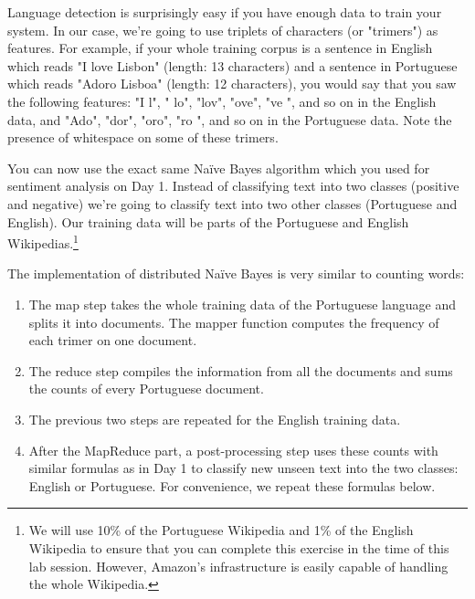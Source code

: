Language detection is surprisingly easy if you have enough data to train your system. In our case, we're going to use triplets of characters (or "trimers") as features. For example, if your whole training corpus is a sentence in English which reads "I love Lisbon" (length: 13 characters) and a sentence in Portuguese which reads "Adoro Lisboa" (length: 12 characters), you would say that you saw the following features: "I l", " lo", "lov", "ove", "ve ", and so on in the English data, and "Ado", "dor", "oro", "ro ", and so on in the Portuguese data. Note the presence of whitespace on some of these trimers.

You can now use the exact same Na\"{i}ve Bayes algorithm which you used for sentiment analysis on Day 1. Instead of classifying text into two classes (positive and negative) we're going to classify text into two other classes (Portuguese and English). Our training data will be parts of the Portuguese and English Wikipedias.\footnote{We will use 10\% of the Portuguese Wikipedia and 1\% of the English Wikipedia to ensure that you can complete this exercise in the time of this lab session. However, Amazon's infrastructure is easily capable of handling the whole Wikipedia.}

The implementation of distributed Na\"{i}ve Bayes is very similar to counting words:
\begin{enumerate}
	\item The map step takes the whole training data of the Portuguese language and splits it into documents. The mapper function computes the frequency of each trimer on one document.
	\item The reduce step compiles the information from all the documents and sums the counts of every Portuguese document.
	\item The previous two steps are repeated for the English training data.
	\item After the MapReduce part, a post-processing step uses these counts with similar formulas as in Day 1 to classify new unseen text into the two classes: English or Portuguese. For convenience, we repeat these formulas below.
\end{enumerate}

